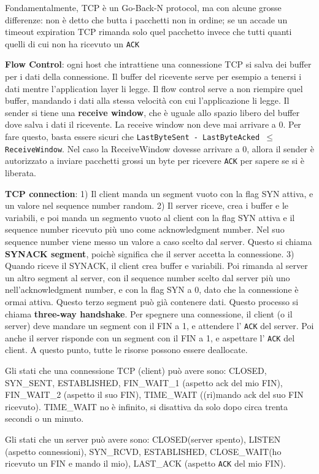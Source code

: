 \documentclass[a4paper,10pt]{article} %
\renewcommand{\b}[1]{%
    {\textbf{#1}}}
\renewcommand{\t}[1]{%
    {\texttt{#1}}}
\begin{document}
Fondamentalmente, TCP è un Go-Back-N protocol, ma con alcune grosse differenze: non è detto che butta i pacchetti non in ordine; se un accade un timeout expiration TCP rimanda solo quel pacchetto invece che tutti quanti quelli di cui non ha ricevuto un \t{ACK}

\b{Flow Control}: ogni host che intrattiene una connessione TCP si salva dei buffer per i dati della connessione. Il buffer del ricevente serve per esempio a tenersi i dati mentre l'application layer li legge. Il flow control serve a non riempire quel buffer, mandando i dati alla stessa velocità con cui l'applicazione li legge. Il sender si tiene una \b{receive window}, che è uguale allo spazio libero del buffer dove salva i dati il ricevente. La receive window non deve mai arrivare a 0. Per fare questo, basta essere sicuri che \t{LastByteSent - LastByteAcked $\leq$ ReceiveWindow}. Nel caso la ReceiveWindow dovesse arrivare a 0, allora il sender è autorizzato a inviare pacchetti grossi un byte per ricevere \t{ACK} per sapere se si è liberata.

\b{TCP connection}: 1) Il client manda un segment vuoto con la flag SYN attiva, e un valore nel sequence number random. 2) Il server riceve, crea i buffer e le variabili, e poi manda un segmento vuoto al client con la flag SYN attiva e il sequence number ricevuto più uno come acknowledgment number. Nel suo sequence number viene messo un valore a caso scelto dal server. Questo si chiama \b{SYNACK segment}, poichè significa che il server accetta la connessione. 3) Quando riceve il SYNACK, il client crea buffer e variabili. Poi rimanda al server un altro segment al server, con il sequence number scelto dal server più uno nell'acknowledgment number, e con la flag SYN a 0, dato che la connessione è ormai attiva. Questo terzo segment può già contenere dati. Questo processo si chiama \b{three-way handshake}. Per spegnere una connessione, il client (o il server) deve mandare un segment con il FIN a 1, e attendere l'\t{ACK} del server. Poi anche il server risponde con un segment con il FIN a 1, e aspettare l'\t{ACK} del client. A questo punto, tutte le risorse possono essere deallocate.

Gli stati che una connessione TCP (client) può avere sono: CLOSED, SYN\_SENT, ESTABLISHED, FIN\_WAIT\_1 (aspetto ack del mio FIN), FIN\_WAIT\_2 (aspetto il suo FIN), TIME\_WAIT ((ri)mando ack del suo FIN ricevuto). TIME\_WAIT no è infinito, si disattiva da solo dopo circa trenta secondi o un minuto.

Gli stati che un server può avere sono: CLOSED(server spento), LISTEN (aspetto connessioni), SYN\_RCVD, ESTABLISHED, CLOSE\_WAIT(ho ricevuto un FIN e mando il mio), LAST\_ACK (aspetto \t{ACK} del mio FIN).
\end{document}
